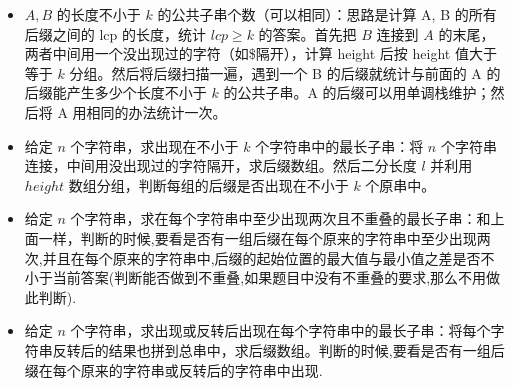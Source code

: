 \begin{itemize}
    \item $A,B$ 的长度不小于 $k$ 的公共子串个数（可以相同）：思路是计算 A, B 的所有后缀之间的 lcp 的长度，统计 $lcp \ge k$ 的答案。首先把 $B$ 连接到 $A$ 的末尾，两者中间用一个没出现过的字符（如\$隔开），计算 height 后按 height 值大于等于 $k$ 分组。然后将后缀扫描一遍，遇到一个 B 的后缀就统计与前面的 A 的后缀能产生多少个长度不小于 $k$ 的公共子串。A 的后缀可以用单调栈维护；然后将 A 用相同的办法统计一次。
    \item 给定 $n$ 个字符串，求出现在不小于 $k$ 个字符串中的最长子串：将 $n$ 个字符串连接，中间用没出现过的字符隔开，求后缀数组。然后二分长度 $l$ 并利用 $height$ 数组分组，判断每组的后缀是否出现在不小于 $k$ 个原串中。
    \item 给定 $n$ 个字符串，求在每个字符串中至少出现两次且不重叠的最长子串：和上面一样，判断的时候,要看是否有一组后缀在每个原来的字符串中至少出现两次,并且在每个原来的字符串中,后缀的起始位置的最大值与最小值之差是否不小于当前答案(判断能否做到不重叠,如果题目中没有不重叠的要求,那么不用做此判断).
    \item 给定 $n$ 个字符串，求出现或反转后出现在每个字符串中的最长子串：将每个字符串反转后的结果也拼到总串中，求后缀数组。判断的时候,要看是否有一组后缀在每个原来的字符串或反转后的字符串中出现.
\end{itemize}

\clearpage